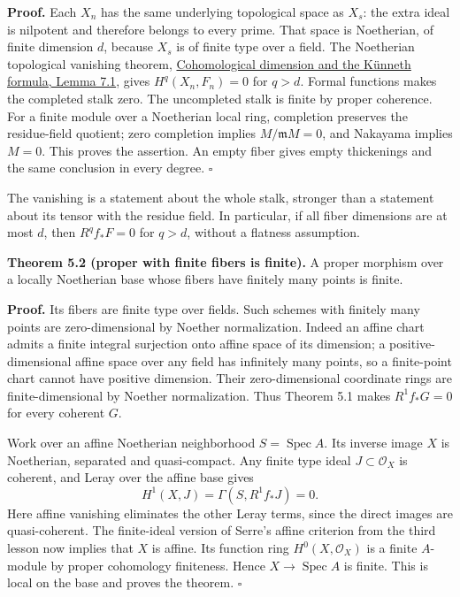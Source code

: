 \documentclass[11pt]{article}
\begin{document}
\textbf{Proof.} Each \(X_n\) has the same underlying topological space
as \(X_s\): the extra ideal is nilpotent and therefore belongs to every
prime. That space is Noetherian, of finite dimension \(d\), because
\(X_s\) is of finite type over a field. The Noetherian topological
vanishing theorem,
\href{../ag-etale-cohomology/cohomological-dimension-and-the-kunneth-formula.html\#7-the-bound-for-all-finite-type-schemes}{Cohomological
dimension and the Künneth formula, Lemma 7.1}, gives \(H^q(X_n,F_n)=0\)
for \(q>d\). Formal functions makes the completed stalk zero. The
uncompleted stalk is finite by proper coherence. For a finite module
over a Noetherian local ring, completion preserves the residue-field
quotient; zero completion implies \(M/\mathfrak mM=0\), and Nakayama
implies \(M=0\). This proves the assertion. An empty fiber gives empty
thickenings and the same conclusion in every degree. \(\square\)

The vanishing is a statement about the whole stalk, stronger than a
statement about its tensor with the residue field. In particular, if all
fiber dimensions are at most \(d\), then \(R^qf_*F=0\) for \(q>d\),
without a flatness assumption.

\textbf{Theorem 5.2 (proper with finite fibers is finite).} A proper
morphism over a locally Noetherian base whose fibers have finitely many
points is finite.

\textbf{Proof.} Its fibers are finite type over fields. Such schemes
with finitely many points are zero-dimensional by Noether normalization.
Indeed an affine chart admits a finite integral surjection onto affine
space of its dimension; a positive-dimensional affine space over any
field has infinitely many points, so a finite-point chart cannot have
positive dimension. Their zero-dimensional coordinate rings are
finite-dimensional by Noether normalization. Thus Theorem 5.1 makes
\(R^1f_*G=0\) for every coherent \(G\).

Work over an affine Noetherian neighborhood \(S=\operatorname{Spec}A\).
Its inverse image \(X\) is Noetherian, separated and quasi-compact. Any
finite type ideal \(J\subset\mathcal O_X\) is coherent, and Leray over
the affine base gives \[
H^1(X,J)=\Gamma(S,R^1f_*J)=0.
\] Here affine vanishing eliminates the other Leray terms, since the
direct images are quasi-coherent. The finite-ideal version of Serre's
affine criterion from the third lesson now implies that \(X\) is affine.
Its function ring \(H^0(X,\mathcal O_X)\) is a finite \(A\)-module by
proper cohomology finiteness. Hence \(X\to\operatorname{Spec}A\) is
finite. This is local on the base and proves the theorem. \(\square\)
\end{document}
